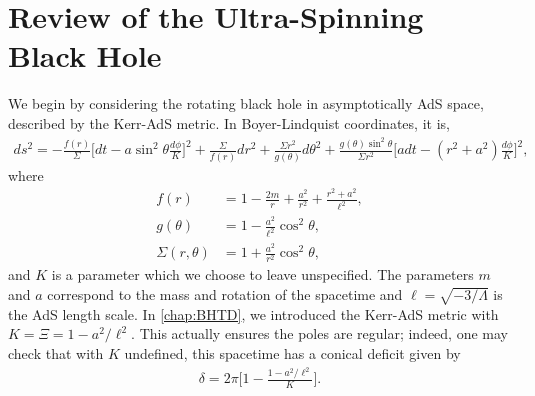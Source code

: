 \documentclass[
twoside,
openright,
frontopenright
]{dmathesis}
\newcommand{\nn}{\nonumber}
\begin{document}

\section{Review of the Ultra-Spinning Black Hole}

We begin by considering the rotating black hole in asymptotically AdS space,
described by the Kerr-AdS metric. In Boyer-Lindquist coordinates, it is, 
\begin{align} \label{eq:kerrAdS}
ds^2 = -\frac{f(r)}{\Sigma}\Big[dt-a\sin^2\theta \frac{d\phi}{K} \Big]^2 +
  \frac{\Sigma}{f(r)}dr^2 + \frac{\Sigma r^2}{g(\theta)}d\theta^2 +
  \frac{g(\theta) \sin^2\theta}{\Sigma r^2} \Big[adt-(r^2+a^2)
  \frac{d\phi}{K}\Big]^2, 
\end{align}
where
\begin{align}
f(r)&= 1-\frac{2 m}{r}+\frac{a^2}{r^2}+\frac{r^2+a^2}{\ell^2},\nn\\
g(\theta)&=1 - \frac{a^2}{\ell^2} \cos^2\theta, \nn\\
\Sigma(r, \theta) &= 1 + \frac{a^2}{r^2} \cos^2\theta,
\end{align}
and $K$ is a parameter which we choose to leave unspecified. The parameters $m$
and $a$ correspond to the mass and rotation of the spacetime and
$\ell = \sqrt{-3/\Lambda}$ is the AdS length scale. In \cref{chap:BHTD}, we
introduced the Kerr-AdS metric with $K = \Xi = 1-a^2/\ell^2$. This actually ensures
the poles are regular; indeed, one may check that with $K$ undefined, this
spacetime has a conical deficit given by
\begin{align}\label{eq:deficit-al}
\delta = 2\pi \bigg[1-\frac{1-a^{2}/\ell^{2}}{K}\bigg].
\end{align}
\end{document}
